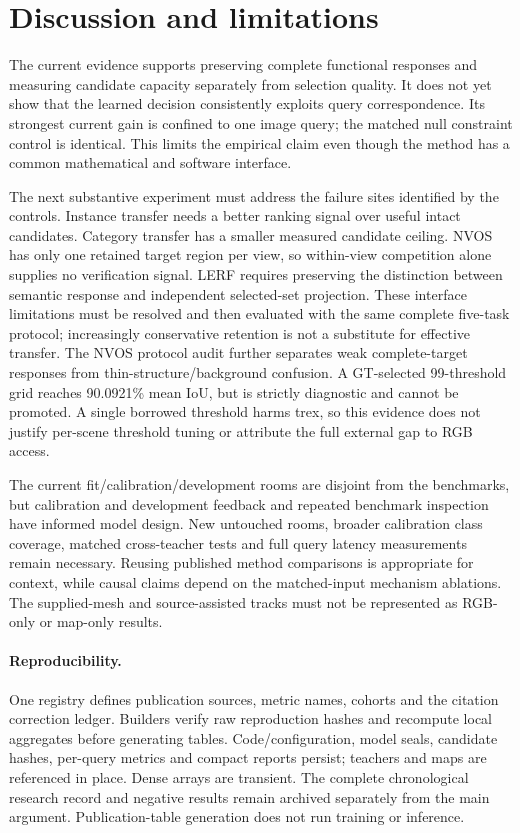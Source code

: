 \section{Discussion and limitations}
The current evidence supports preserving complete functional responses and
measuring candidate capacity separately from selection quality. It does not
yet show that the learned decision consistently exploits query correspondence.
Its strongest current gain is confined to one image query; the matched null
constraint control is identical. This limits the empirical claim even though
the method has a common mathematical and software interface.

The next substantive experiment must address the failure sites identified by
the controls. Instance transfer needs a better ranking signal over useful
intact candidates. Category transfer has a smaller measured candidate ceiling.
NVOS has only one retained target region per view, so within-view competition
alone supplies no verification signal. LERF requires preserving the distinction
between semantic response and independent selected-set projection. These
interface limitations must be resolved and then evaluated with the same
complete five-task protocol; increasingly conservative retention is not a
substitute for effective transfer.
The NVOS protocol audit further separates weak complete-target responses from
thin-structure/background confusion. A GT-selected 99-threshold grid reaches
90.0921\% mean IoU, but is strictly diagnostic and cannot be promoted. A single
borrowed threshold harms trex, so this evidence does not justify per-scene
threshold tuning or attribute the full external gap to RGB access.

The current fit/calibration/development rooms are disjoint from the benchmarks,
but calibration and development feedback and repeated benchmark inspection have
informed model design. New untouched rooms, broader calibration class coverage,
matched cross-teacher tests and full query latency measurements remain necessary.
Reusing published method comparisons is appropriate for context, while causal
claims depend on the matched-input mechanism ablations. The supplied-mesh and
source-assisted tracks must not be represented as RGB-only or map-only results.

\paragraph{Reproducibility.}
One registry defines publication sources, metric names, cohorts and the citation
correction ledger. Builders verify raw reproduction hashes and recompute local
aggregates before generating tables. Code/configuration, model seals, candidate
hashes, per-query metrics and compact reports persist; teachers and maps are
referenced in place. Dense arrays are transient. The complete chronological
research record and negative results remain archived separately from the main
argument. Publication-table generation does not run training or inference.

